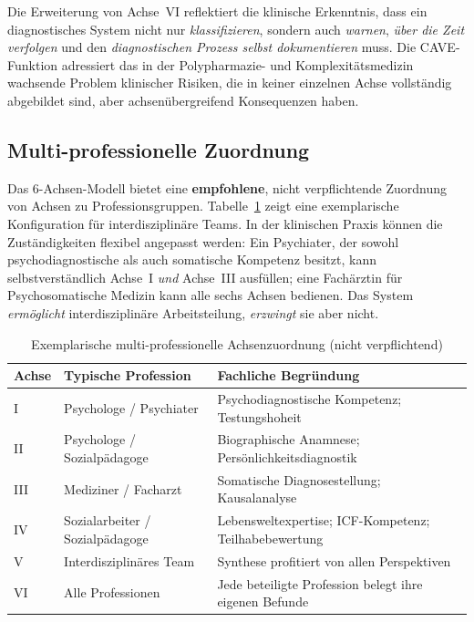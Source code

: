 \documentclass[11pt,a4paper]{article}
\begin{document}
Die Erweiterung von Achse~VI reflektiert die klinische Erkenntnis, dass ein diagnostisches System nicht nur \textit{klassifizieren}, sondern auch \textit{warnen}, \textit{\"uber die Zeit verfolgen} und den \textit{diagnostischen Prozess selbst dokumentieren} muss. Die CAVE-Funktion adressiert das in der Polypharmazie- und Komplexit\"atsmedizin wachsende Problem klinischer Risiken, die in keiner einzelnen Achse vollst\"andig abgebildet sind, aber achsen\"ubergreifend Konsequenzen haben.

\subsection{Multi-professionelle Zuordnung}
\label{sec:multiprofessionell}

Das 6-Achsen-Modell bietet eine \textbf{empfohlene}, nicht verpflichtende Zuordnung von Achsen zu Professionsgruppen. Tabelle~\ref{tab:professionen} zeigt eine exemplarische Konfiguration f\"ur interdisziplin\"are Teams. In der klinischen Praxis k\"onnen die Zust\"andigkeiten flexibel angepasst werden: Ein Psychiater, der sowohl psychodiagnostische als auch somatische Kompetenz besitzt, kann selbstverst\"andlich Achse~I \textit{und} Achse~III ausf\"ullen; eine Fach\"arztin f\"ur Psychosomatische Medizin kann alle sechs Achsen bedienen. Das System \textit{erm\"oglicht} interdisziplin\"are Arbeitsteilung, \textit{erzwingt} sie aber nicht.

\begin{table}[H]
\centering
\caption{Exemplarische multi-professionelle Achsenzuordnung (nicht verpflichtend)}
\label{tab:professionen}
\begin{tabularx}{\textwidth}{lXX}
\toprule
\textbf{Achse} & \textbf{Typische Profession} & \textbf{Fachliche Begr\"undung} \\
\midrule
I & Psychologe / Psychiater & Psychodiagnostische Kompetenz; Testungshoheit \\
\addlinespace
II & Psychologe / Sozialp\"adagoge & Biographische Anamnese; Pers\"onlichkeitsdiagnostik \\
\addlinespace
III & Mediziner / Facharzt & Somatische Diagnosestellung; Kausalanalyse \\
\addlinespace
IV & Sozialarbeiter / Sozialp\"adagoge & Lebensweltexpertise; ICF-Kompetenz; Teilhabebewertung \\
\addlinespace
V & Interdisziplin\"ares Team & Synthese profitiert von allen Perspektiven \\
\addlinespace
VI & Alle Professionen & Jede beteiligte Profession belegt ihre eigenen Befunde \\
\bottomrule
\end{tabularx}
\end{table}
\end{document}
